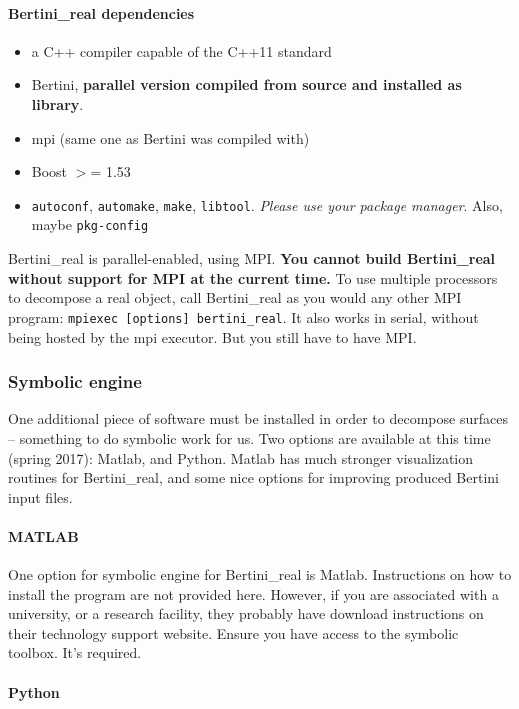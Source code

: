 \paragraph{Bertini\_real dependencies}

\begin{itemize}
\item a C++ compiler capable of the C++11 standard
\item Bertini, {\bf parallel version compiled from source and installed as library}.
\item \gls{mpi} (same one as Bertini was compiled with)
\item Boost $>$= 1.53
\item {\tt autoconf}, {\tt automake}, {\tt make}, {\tt libtool}.  {\em Please use your package manager}.  Also, maybe {\tt pkg-config}
\end{itemize} 



Bertini\_real is parallel-enabled, using MPI.  {\bf You cannot build Bertini\_real without support for MPI at the current time.}  To use multiple processors to decompose a real object, call Bertini\_real as you would any other MPI program: \texttt{mpiexec [options] bertini\_real}.  It also works in serial, without being hosted by the mpi executor.  But you still have to have MPI.  


\subsubsection{Symbolic engine}

One additional piece of software must be installed in order to decompose surfaces -- something to do symbolic work for us.  Two options are available at this time (spring 2017):  Matlab, and Python.  Matlab has much stronger visualization routines for Bertini\_real, and some nice options for improving produced Bertini input files.

	\paragraph*{MATLAB}
One option for symbolic engine for Bertini\_real is Matlab.  Instructions on how to install the program are not provided here. However, if you are associated with a university, or a research facility, they probably have download instructions on their technology support website.   Ensure you have access to the symbolic toolbox.  It's required.

\paragraph*{Python}

